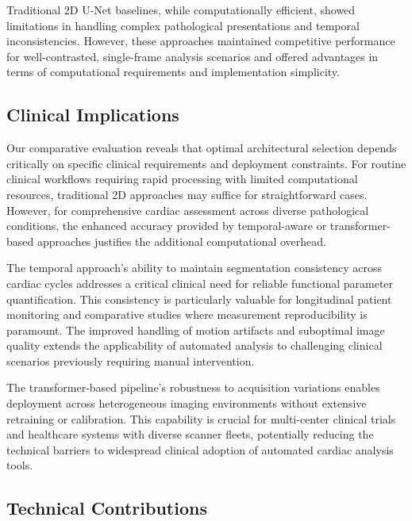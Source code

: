 \documentclass[twoside,11pt]{article}
\begin{document}
  Traditional 2D U-Net baselines, while computationally efficient, showed limitations in handling complex pathological presentations and temporal inconsistencies. However, these approaches maintained competitive performance for well-contrasted, single-frame analysis scenarios and offered advantages in terms of computational requirements and implementation simplicity.
  
  \subsection{Clinical Implications}
  
  Our comparative evaluation reveals that optimal architectural selection depends critically on specific clinical requirements and deployment constraints. For routine clinical workflows requiring rapid processing with limited computational resources, traditional 2D approaches may suffice for straightforward cases. However, for comprehensive cardiac assessment across diverse pathological conditions, the enhanced accuracy provided by temporal-aware or transformer-based approaches justifies the additional computational overhead.
  
  The temporal approach's ability to maintain segmentation consistency across cardiac cycles addresses a critical clinical need for reliable functional parameter quantification. This consistency is particularly valuable for longitudinal patient monitoring and comparative studies where measurement reproducibility is paramount. The improved handling of motion artifacts and suboptimal image quality extends the applicability of automated analysis to challenging clinical scenarios previously requiring manual intervention.
  
  The transformer-based pipeline's robustness to acquisition variations enables deployment across heterogeneous imaging environments without extensive retraining or calibration. This capability is crucial for multi-center clinical trials and healthcare systems with diverse scanner fleets, potentially reducing the technical barriers to widespread clinical adoption of automated cardiac analysis tools.
  
  \subsection{Technical Contributions}
  
\end{document}

